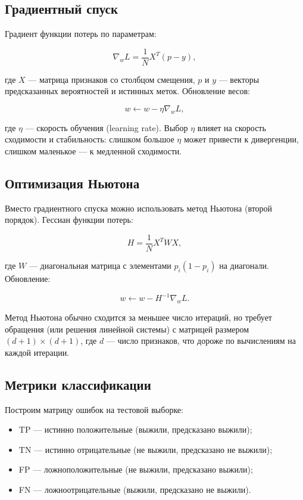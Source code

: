 \documentclass[12pt,a4paper]{article}
\begin{document}
\subsection{Градиентный спуск}
Градиент функции потерь по параметрам:

\begin{equation}
\nabla_w L = \frac{1}{N}X^T(p-y),
\end{equation}

где \(X\) --- матрица признаков со столбцом смещения, \(p\) и \(y\) --- векторы предсказанных вероятностей и истинных меток. Обновление весов:

\begin{equation}
w \leftarrow w - \eta \nabla_w L,
\end{equation}

где \(\eta\) --- скорость обучения (learning rate). Выбор \(\eta\) влияет на скорость сходимости и стабильность: слишком большое \(\eta\) может привести к дивергенции, слишком маленькое --- к медленной сходимости.

\subsection{Оптимизация Ньютона}
Вместо градиентного спуска можно использовать метод Ньютона (второй порядок). Гессиан функции потерь:

\begin{equation}
H = \frac{1}{N}X^T W X,
\end{equation}

где \(W\) --- диагональная матрица с элементами \(p_i(1-p_i)\) на диагонали. Обновление:

\begin{equation}
w \leftarrow w - H^{-1}\nabla_w L.
\end{equation}

Метод Ньютона обычно сходится за меньшее число итераций, но требует обращения (или решения линейной системы) с матрицей размером \((d+1) \times (d+1)\), где \(d\) --- число признаков, что дороже по вычислениям на каждой итерации.

\subsection{Метрики классификации}
Построим матрицу ошибок на тестовой выборке:
\begin{itemize}
\item TP --- истинно положительные (выжили, предсказано выжили);
\item TN --- истинно отрицательные (не выжили, предсказано не выжили);
\item FP --- ложноположительные (не выжили, предсказано выжили);
\item FN --- ложноотрицательные (выжили, предсказано не выжили).
\end{itemize}
\end{document}
